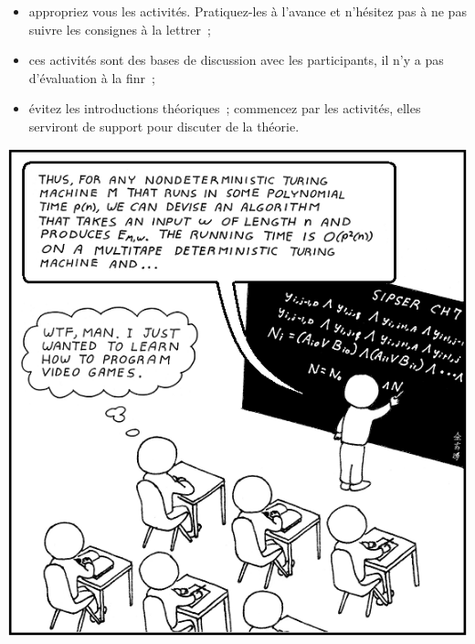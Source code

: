 \documentclass[a5paper,pagesize,DIV=14]{scrbook}
\begin{document}
\begin{itemize}
\item appropriez vous les activités. Pratiquez-les à l'avance et n'hésitez pas à
  ne pas suivre les consignes à la lettrer~;
\item ces activités sont des bases de discussion avec les participants, il n'y a
  pas d'évaluation à la finr~;
\item évitez les introductions théoriques~; commencez par les activités, elles
  serviront de support pour discuter de la théorie.
\end{itemize}

\begin{center}
  \includegraphics[width=0.7\linewidth]{img/computer_science_major.PNG}
  \label{img:CSmajor}
\end{center}





\end{document}

